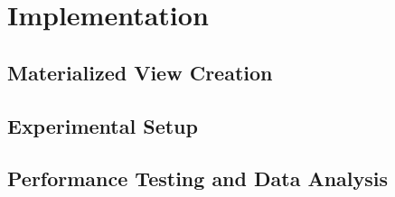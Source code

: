 \section{Implementation}
\subsection{Materialized View Creation}
\subsection{Experimental Setup}
\subsection{Performance Testing and Data Analysis}